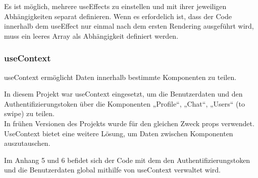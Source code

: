 \begin{flushleft}
  Es ist möglich, mehrere useEffects zu einstellen und mit ihrer jeweiligen Abhängigkeiten separat definieren.
  Wenn es erfordelich ist, dass der Code innerhalb dem useEffect nur einmal nach dem ersten Rendering ausgeführt wird, muss ein leeres Array als Abhängigkeit definiert werden.
\end{flushleft}

\subsubsection{useContext}
useContext ermöglicht Daten innerhalb bestimmte Komponenten zu teilen.

In diesem Projekt war useContext eingesetzt, um die Benutzerdaten und den Authentifizierungstoken über die Komponenten  „Profile“, „Chat“, „Users“ (to swipe) zu teilen.
\\
In frühen Versionen des Projekts wurde für den gleichen Zweck props verwendet.  {\cite{R03}}
UseContext bietet eine weitere Lösung, um Daten zwischen Komponenten auszutauschen.{\cite{R04}}
\\

Im Anhang 5 und 6 befidet sich der Code mit dem den Authentifizierungstoken und die Benutzerdaten global  mithilfe von useContext verwaltet wird.




